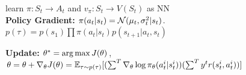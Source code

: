 learn $\pi: S_t \rightarrow A_t$ and $v_\pi: S_t \rightarrow V(S_t)$ as NN\\

\textbf{Policy Gradient:} $\pi(a_t|s_t) = \mathcal{N}(\mu_t, \sigma_t^2 | s_t)$. $p(\tau) = p(s_1)\prod \pi(a_t|s_t) p(s_{t+1} | a_t, s_t)$\\

\textbf{Update:} $\theta^* = \operatorname*{arg\,max} J(\theta)$, $\theta = \theta + \nabla_\theta J(\theta) = \mathbb{E}_{\tau \sim p(\tau)}[(\sum^T \nabla_\theta \log \pi_\theta(a_t^i | s_t^i))(\sum^T y^t r(s_t^i, a_t^i))]$\\

